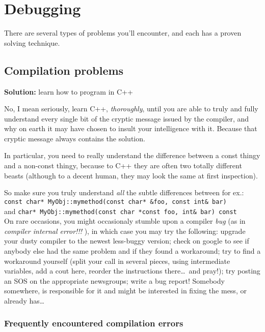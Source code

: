\documentclass[11pt]{book}
\begin{document}
\chapter{Debugging}

 There are several types of problems you'll encounter, and each has a
proven solving technique.

\section{Compilation problems}

{\bf Solution: } learn how to program in C++

 No, I mean seriously, learn C++, {\em thoroughly}, until you are
able to truly and fully understand every single bit of the cryptic
message issued by the compiler, and why on earth it may have chosen
to insult your intelligence with it. Because that cryptic message
always contains the solution.

 In particular, you need to really understand the difference between
a const thingy and a non-const thingy, because to C++ they are often
two totally different beasts (although to a decent human, they may
look the same at first inspection).

 So make sure you truly understand {\em all} the subtle differences
between for ex.: \\
\verb!const char* MyObj::mymethod(const char* &foo, const int& bar)!  \\
and
\verb!char* MyObj::mymethod(const char *const foo, int& bar) const! \\


 On rare occasions, you might occasionaly stumble upon a compiler
{\em bug} (as in {\em compiler internal error!!!} ), in which case
you may try the following: upgrade your dusty compiler to the newest
less-buggy version; check on google to see if anybody else had the
same problem and if they found a workaround; try to find a workaround
yourself (split your call in several pieces, using intermediate
variables, add a cout here, reorder the instructions there\ldots\ 
and pray!); try posting an SOS on the appropriate newsgroups; write
a bug report! Somebody somewhere, is responsible for it and might be
interested in fixing the mess, or already has\ldots


\subsection{Frequently encountered compilation errors}
\end{document}
